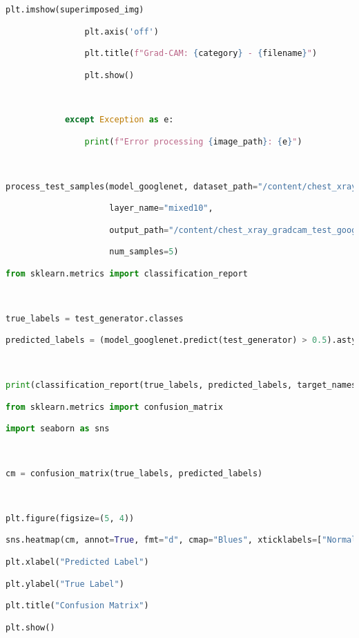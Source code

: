 \documentclass{article}
\begin{document}
\begin{lstlisting}[style=mystyle,language=Python]
                plt.imshow(superimposed_img)

                plt.axis('off')

                plt.title(f"Grad-CAM: {category} - {filename}")

                plt.show()



            except Exception as e:

                print(f"Error processing {image_path}: {e}")



process_test_samples(model_googlenet, dataset_path="/content/chest_xray/test",

                     layer_name="mixed10",

                     output_path="/content/chest_xray_gradcam_test_googlenet",

                     num_samples=5)

from sklearn.metrics import classification_report



true_labels = test_generator.classes

predicted_labels = (model_googlenet.predict(test_generator) > 0.5).astype("int32")



print(classification_report(true_labels, predicted_labels, target_names=["Normal", "Pneumonia"]))

from sklearn.metrics import confusion_matrix

import seaborn as sns



cm = confusion_matrix(true_labels, predicted_labels)



plt.figure(figsize=(5, 4))

sns.heatmap(cm, annot=True, fmt="d", cmap="Blues", xticklabels=["Normal", "Pneumonia"], yticklabels=["Normal", "Pneumonia"])

plt.xlabel("Predicted Label")

plt.ylabel("True Label")

plt.title("Confusion Matrix")

plt.show()
\end{lstlisting}
\end{document}
